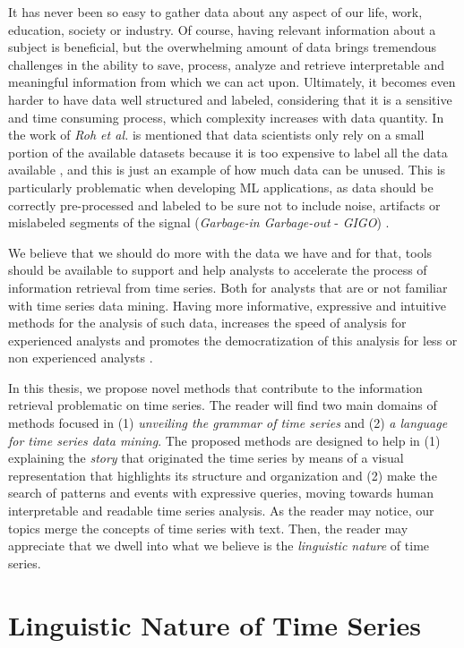 It has never been so easy to gather data about any aspect of our life, work, education, society or industry. Of course, having relevant information about a subject is beneficial, but the overwhelming amount of data  brings tremendous challenges in the ability to save, process, analyze and retrieve interpretable and meaningful information from which we can act upon\cite{bigdata}. Ultimately, it becomes even harder to have data well structured and labeled, considering that it is a sensitive and time consuming process, which complexity increases with data quantity. In the work of \textit{Roh et al.} is mentioned that data scientists only rely on a small portion of the available datasets because it is too expensive to label all the data available \cite{roh2019survey}, and this is just an example of how much data can be unused. This is particularly problematic when developing \gls{ML} applications, as data should be correctly pre-processed and labeled to be sure not to include noise, artifacts or mislabeled segments of the signal (\textit{Garbage-in Garbage-out} - \textit{GIGO}) \cite{roh2019survey}.
\par
We believe that we should do more with the data we have and for that, tools should be available to support and help analysts to accelerate the process of information retrieval from time series. Both for analysts that are or not familiar with time series data mining. Having more informative, expressive and intuitive methods for the analysis of such data, increases the speed of analysis for experienced analysts and promotes the democratization of this analysis for less or non experienced analysts \cite{democratize}.
\par
In this thesis, we propose novel methods that contribute to the information retrieval problematic on time series. The reader will find two main domains of methods focused in (1) \textit{unveiling the grammar of time series} and (2) \textit{a language for time series data mining}. The proposed methods are designed to help in (1) explaining the \textit{story} that originated the time series by means of a visual representation that highlights its structure and organization and (2) make the search of patterns and events with expressive queries, moving towards human interpretable and readable time series analysis. As the reader may notice, our topics merge the concepts of time series with text. Then, the reader may appreciate that we dwell into what we believe is the \textit{linguistic nature} of time series.  

\section{Linguistic Nature of Time Series}
\label{sub:context1}

